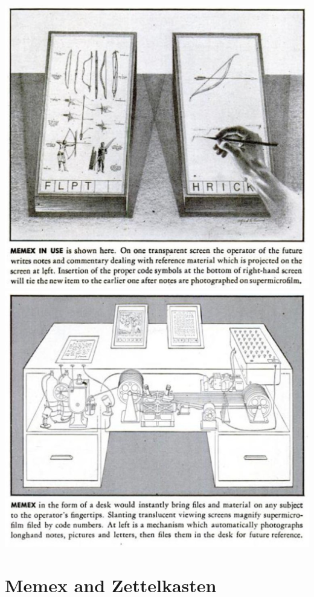 \documentclass[
]{book}
\begin{document}
\includegraphics{./images/memex02.jpg}
\includegraphics{./images/memex03.jpg}

\hypertarget{memex-and-zettelkasten}{%
\chapter*{Memex and Zettelkasten}\label{memex-and-zettelkasten}}
\end{document}
